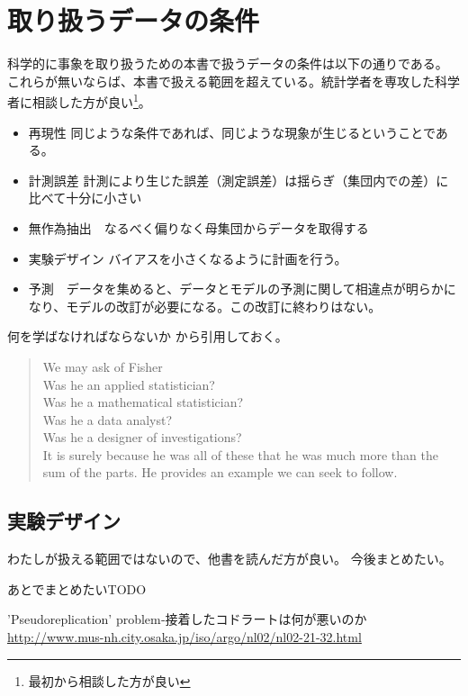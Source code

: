 \chapter{取り扱うデータの条件}
科学的に事象を取り扱うための本書で扱うデータの条件は以下の通りである。
これらが無いならば、本書で扱える範囲を超えている。統計学者を専攻した科学者に相談した方が良い\footnote{最初から相談した方が良い}。

\begin{itemize}
    \item 再現性 同じような条件であれば、同じような現象が生じるということである。
    \item 計測誤差  計測により生じた誤差（測定誤差）は揺らぎ（集団内での差）に比べて十分に小さい
    \item 無作為抽出　なるべく偏りなく母集団からデータを取得する%
    \item 実験デザイン バイアスを小さくなるように計画を行う。
    \item 予測　データを集めると、データとモデルの予測に関して相違点が明らかになり、モデルの改訂が必要になる。この改訂に終わりはない。
\end{itemize}


\begin{SMbox}{何を学ばなければならないか}
    \cite{box1976science}から引用しておく。
    \begin{quote}
        We may ask of Fisher \\
        Was he an applied statistician? \\
        Was he a mathematical statistician?  \\
        Was he a data analyst? \\
        Was he a designer of investigations?\\
        It is surely because he was all of these that he was much more than the sum of the parts. He provides an example we can seek to follow. 
    \end{quote}
\end{SMbox}

\section{実験デザイン}
わたしが扱える範囲ではないので、他書を読んだ方が良い。
今後まとめたい。
\begin{SMbox}{あとでまとめたいTODO}

    'Pseudoreplication' problem‐接着したコドラートは何が悪いのか
 \url{http://www.mus-nh.city.osaka.jp/iso/argo/nl02/nl02-21-32.html}
\end{SMbox}

